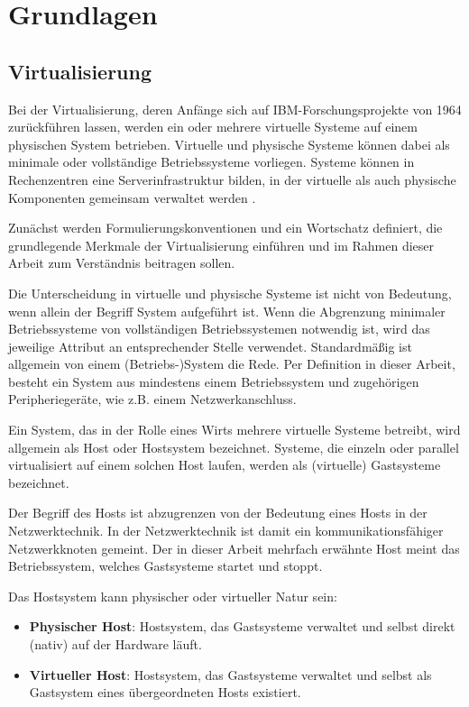 \documentclass[../main.tex]{subfiles}
\begin{document}
\chapter{Grundlagen}
\label{basics}

	\section{Virtualisierung}
  \label{introVirt}
    Bei der Virtualisierung, deren Anfänge sich auf IBM-Forschungsprojekte von 1964 zurückführen lassen, werden ein oder mehrere virtuelle Systeme auf einem physischen System betrieben. Virtuelle und physische Systeme können dabei als minimale oder vollständige Betriebssysteme vorliegen. Systeme können in Rechenzentren eine Serverinfrastruktur bilden, in der virtuelle als auch physische Komponenten gemeinsam verwaltet werden \cite[S.661]{tanenbaumOS}.

		Zunächst werden Formulierungskonventionen und ein Wortschatz definiert, die grundlegende Merkmale der Virtualisierung einführen und im Rahmen dieser Arbeit zum Verständnis beitragen sollen.

		Die Unterscheidung in \glqq{}virtuelle\grqq{} und \glqq{}physische\grqq{} Systeme ist nicht von Bedeutung, wenn allein der Begriff \glqq{}System\grqq{} aufgeführt ist. Wenn die Abgrenzung minimaler Betriebssysteme von vollständigen Betriebssystemen notwendig ist, wird das jeweilige Attribut an entsprechender Stelle verwendet. Standardmäßig ist allgemein von einem (Betriebs-)System die Rede. Per Definition in dieser Arbeit, besteht ein System aus mindestens einem Betriebssystem und zugehörigen Peripheriegeräte, wie z.B. einem Netzwerkanschluss.

		Ein System, das in der Rolle eines Wirts mehrere virtuelle Systeme betreibt, wird allgemein als Host oder Hostsystem bezeichnet. Systeme, die einzeln oder parallel virtualisiert auf einem solchen Host laufen, werden als (virtuelle) Gastsysteme bezeichnet.

		Der Begriff des Hosts ist abzugrenzen von der Bedeutung eines Hosts in der Netzwerktechnik. In der Netzwerktechnik ist damit ein kommunikationsfähiger Netzwerkknoten gemeint. Der in dieser Arbeit mehrfach erwähnte Host meint das Betriebssystem, welches Gastsysteme startet und stoppt.

		Das Hostsystem kann physischer oder virtueller Natur sein:
		\begin{itemize}
			\item \textbf{Physischer Host}: Hostsystem, das Gastsysteme verwaltet und selbst direkt (nativ) auf der Hardware läuft.
			\item \textbf{Virtueller Host}: Hostsystem, das Gastsysteme verwaltet und selbst als Gastsystem eines übergeordneten Hosts existiert.
		\end{itemize}
\end{document}

